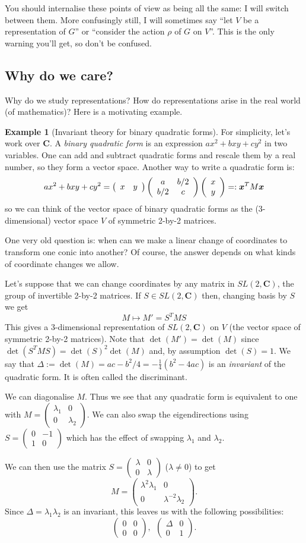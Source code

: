 \documentclass[12pt]{article}
\renewcommand\vec[1]{\ensuremath\boldsymbol{#1}}
\newcommand{\CC}{\mathbf{C}}
\newcommand{\vrow}[2]{\left(\begin{array}{cc}#1 & #2\end{array}\right)}
\newcommand{\vcol}[2]{\left(\begin{array}{c}#1\\ #2\end{array}\right)}
\newcommand{\matr}[4]{\left(\begin{array}{cc}#1 & #2\\ #3 & #4\end{array}\right)}
\theoremstyle{definition}
\newtheorem{exm}[thm]{Example}
\theoremstyle{check}
\theoremstyle{remark}
\theoremstyle{TheoremNum}
\begin{document}
You should internalise these points of view as being all the same: I will switch between them. More confusingly still, I will sometimes say ``let $V$ be a representation of $G$'' or ``consider the action $\rho$ of $G$ on $V$''. This is the only warning you'll get, so don't be confused.

\subsection{Why do we care?}

Why do we study representations? How do representations arise in the real world (of mathematics)? Here is a motivating example.

\begin{exm}[Invariant theory for binary quadratic forms] For simplicity, let's work over $\CC$. A {\em binary quadratic form} is an expression $ax^2+bxy+cy^2$ in two variables. One can add and subtract quadratic forms and rescale them by a real number, so they form a vector space. Another way to write a quadratic form is:
\[ax^2+bxy+cy^2=\vrow{x}{y}\matr{a}{b/2}{b/2}{c}\vcol{x}{y}=:\vec{x}^TM\vec{x}\]
so we can think of the vector space of binary quadratic forms as the (3-dimensional) vector space $V$ of symmetric 2-by-2 matrices.

One very old question is: when can we make a linear change of coordinates to transform one conic into another? Of course, the answer depends on what kinds of coordinate changes we allow.

Let's suppose that we can change coordinates by any matrix in $SL(2,\CC)$, the group of invertible 2-by-2 matrices. If $S\in SL(2,\CC)$ then, changing basis by $S$ we get
\[M\mapsto M'=S^TMS\]
This gives a 3-dimensional representation of $SL(2,\CC)$ on $V$ (the vector space of symmetric 2-by-2 matrices). Note that $\det(M')=\det(M)$ since $\det(S^TMS)=\det(S)^2\det(M)$ and, by assumption $\det(S)=1$. We say that $\Delta:=\det(M)=ac-b^2/4=-\frac{1}{4}(b^2-4ac)$ is an {\em invariant} of the quadratic form. It is often called the discriminant.

We can diagonalise $M$. Thus we see that any quadratic form is equivalent to one with $M=\matr{\lambda_1}{0}{0}{\lambda_2}$. We can also swap the eigendirections using $S=\matr{0}{-1}{1}{0}$ which has the effect of swapping $\lambda_1$ and $\lambda_2$.

We can then use the matrix $S=\matr{\lambda}{0}{0}{\lambda}$ ($\lambda\neq 0$) to get
\[M=\matr{\lambda^2\lambda_1}{0}{0}{\lambda^{-2}\lambda_2}.\]
Since $\Delta=\lambda_1\lambda_2$ is an invariant, this leaves us with the following possibilities:
\[\matr{0}{0}{0}{0},\ \ \matr{\Delta}{0}{0}{1}.\]
\end{exm}
\end{document}
